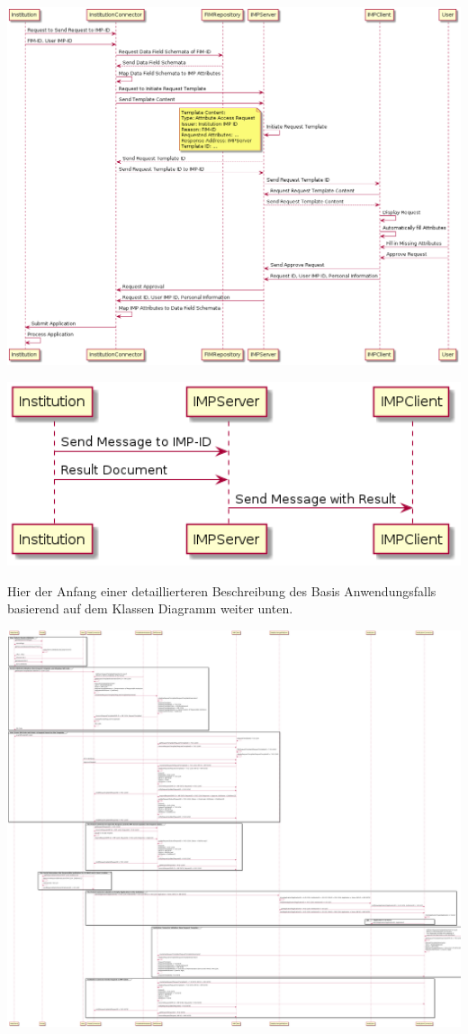 \documentclass[
     12pt,         %
     a4paper,      %
     BCOR=10mm,version=first,     %
     DIV=14,version=first,        %
     ]{scrreprt}
\begin{document}
\includegraphics[width=15cm]{Institution Request.png}

\includegraphics[width=15cm]{Submit Result.png}

Hier der Anfang einer detaillierteren Beschreibung des Basis Anwendungsfalls basierend auf dem Klassen Diagramm weiter unten.

\includegraphics[width=15cm]{Sequence Diagram.png}
\end{document}
